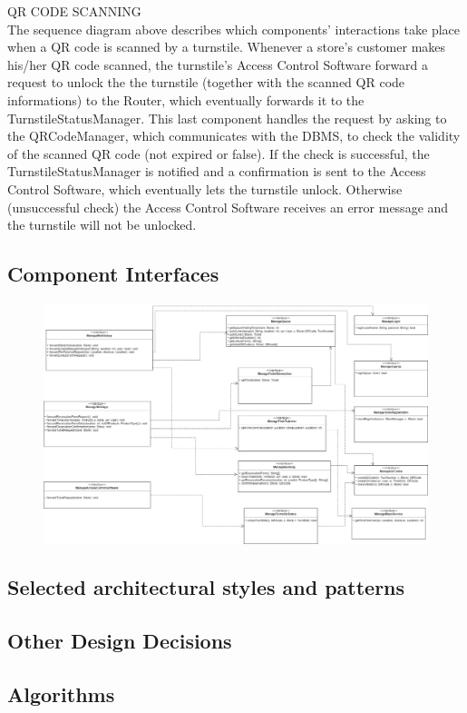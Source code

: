 \documentclass{article}
\begin{document}
QR CODE SCANNING\\
The sequence diagram above describes which components’ interactions take place when a QR code is scanned by a turnstile. Whenever a store’s customer makes his/her QR code scanned, the turnstile’s Access Control Software forward a request to unlock the the turnstile (together with the scanned QR code informations) to the Router, which eventually forwards it to the TurnstileStatusManager. This last component handles the request by asking to the QRCodeManager, which communicates with the DBMS, to check the validity of the scanned QR code (not expired or false). If the check is successful, the TurnstileStatusManager is notified and a confirmation is sent to the Access Control Software, which eventually lets the turnstile unlock. Otherwise (unsuccessful check) the Access Control Software receives an error message and the turnstile will not be unlocked.
\subsection{Component Interfaces}
\begin{figure}[H]
  \includegraphics[width=\linewidth]{interfacesDiagram.png}
  
\end{figure}
\subsection{Selected architectural styles and patterns}
\subsection{Other Design Decisions}
\subsection{Algorithms}
\end{document}
